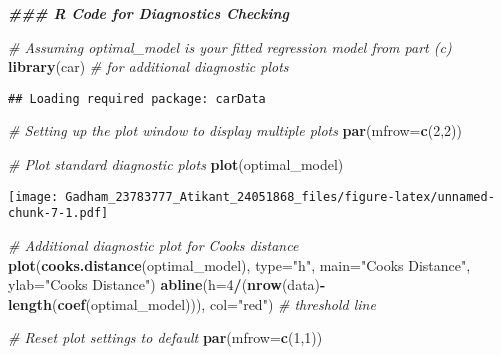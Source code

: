 \documentclass[
]{article}
\newenvironment{Shaded}{\begin{snugshade}}{\end{snugshade}}
\newcommand{\AttributeTok}[1]{\textcolor[rgb]{0.13,0.29,0.53}{#1}}
\newcommand{\CommentTok}[1]{\textcolor[rgb]{0.56,0.35,0.01}{\textit{#1}}}
\newcommand{\DecValTok}[1]{\textcolor[rgb]{0.00,0.00,0.81}{#1}}
\newcommand{\DocumentationTok}[1]{\textcolor[rgb]{0.56,0.35,0.01}{\textbf{\textit{#1}}}}
\newcommand{\FunctionTok}[1]{\textcolor[rgb]{0.13,0.29,0.53}{\textbf{#1}}}
\newcommand{\NormalTok}[1]{#1}
\newcommand{\SpecialCharTok}[1]{\textcolor[rgb]{0.81,0.36,0.00}{\textbf{#1}}}
\newcommand{\StringTok}[1]{\textcolor[rgb]{0.31,0.60,0.02}{#1}}
\begin{document}
\begin{Shaded}
\begin{Highlighting}[]
\DocumentationTok{\#\#\# R Code for Diagnostics Checking}

\CommentTok{\# Assuming \textquotesingle{}optimal\_model\textquotesingle{} is your fitted regression model from part (c)}
\FunctionTok{library}\NormalTok{(car)  }\CommentTok{\# for additional diagnostic plots}
\end{Highlighting}
\end{Shaded}

\begin{verbatim}
## Loading required package: carData
\end{verbatim}

\begin{Shaded}
\begin{Highlighting}[]
\CommentTok{\# Setting up the plot window to display multiple plots}
\FunctionTok{par}\NormalTok{(}\AttributeTok{mfrow=}\FunctionTok{c}\NormalTok{(}\DecValTok{2}\NormalTok{,}\DecValTok{2}\NormalTok{))}

\CommentTok{\# Plot standard diagnostic plots}
\FunctionTok{plot}\NormalTok{(optimal\_model)}
\end{Highlighting}
\end{Shaded}

\texttt{[image: Gadham\_23783777\_Atikant\_24051868\_files/figure-latex/unnamed-chunk-7-1.pdf]}

\begin{Shaded}
\begin{Highlighting}[]
\CommentTok{\# Additional diagnostic plot for Cook\textquotesingle{}s distance}
\FunctionTok{plot}\NormalTok{(}\FunctionTok{cooks.distance}\NormalTok{(optimal\_model), }\AttributeTok{type=}\StringTok{"h"}\NormalTok{, }\AttributeTok{main=}\StringTok{"Cook\textquotesingle{}s Distance"}\NormalTok{, }\AttributeTok{ylab=}\StringTok{"Cook\textquotesingle{}s Distance"}\NormalTok{)}
\FunctionTok{abline}\NormalTok{(}\AttributeTok{h=}\DecValTok{4}\SpecialCharTok{/}\NormalTok{(}\FunctionTok{nrow}\NormalTok{(data)}\SpecialCharTok{{-}}\FunctionTok{length}\NormalTok{(}\FunctionTok{coef}\NormalTok{(optimal\_model))), }\AttributeTok{col=}\StringTok{"red"}\NormalTok{)  }\CommentTok{\# threshold line}

\CommentTok{\# Reset plot settings to default}
\FunctionTok{par}\NormalTok{(}\AttributeTok{mfrow=}\FunctionTok{c}\NormalTok{(}\DecValTok{1}\NormalTok{,}\DecValTok{1}\NormalTok{))}
\end{Highlighting}
\end{Shaded}
\end{document}
